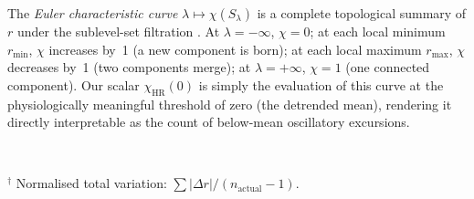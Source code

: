 \documentclass[12pt,a4paper]{article}
\begin{document}
The \emph{Euler characteristic curve} $\lambda \mapsto \chi(S_\lambda)$
is a complete topological summary of $r$ under the sublevel-set filtration
\cite{edelsbrunner2010}.
At $\lambda = -\infty$, $\chi = 0$; at each local minimum $r_{\min}$,
$\chi$ increases by~1 (a new component is born); at each local maximum
$r_{\max}$, $\chi$ decreases by~1 (two components merge); at
$\lambda = +\infty$, $\chi = 1$ (one connected component).
Our scalar $\chi_{\text{HR}}(0)$ is simply the evaluation of this curve
at the physiologically meaningful threshold of zero (the detrended mean),
rendering it directly interpretable as the count of below-mean oscillatory
excursions.

\clearpage

\begin{table}[htbp]
\centering
\caption{Between-group comparisons of topological indicators (GEE,
Gaussian family, exchangeable correlation, \texttt{stay\_id} clustering).
$p$-values are Holm--Bonferroni corrected globally across all 18 tests
(6 metrics $\times$ 3 time summaries).
Values are group means.}
\label{tab:gee}
\small
{}
\vspace{2pt}\\
\raggedright
\footnotesize $^\dag$ Normalised total variation: $\sum|\Delta r| / (n_{\text{actual}}-1)$.
\end{table}
\end{document}
